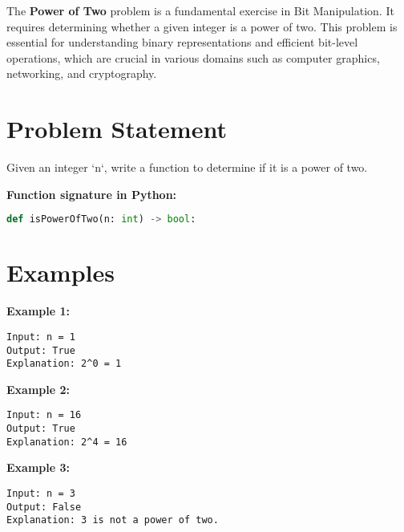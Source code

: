 
\label{chap:Power_of_Two}

The \textbf{Power of Two} problem is a fundamental exercise in Bit Manipulation. It requires determining whether a given integer is a power of two. This problem is essential for understanding binary representations and efficient bit-level operations, which are crucial in various domains such as computer graphics, networking, and cryptography.

\section*{Problem Statement}

Given an integer `n`, write a function to determine if it is a power of two.

\textbf{Function signature in Python:}
\begin{lstlisting}[language=Python]
def isPowerOfTwo(n: int) -> bool:
\end{lstlisting}

\section*{Examples}

\textbf{Example 1:}

\begin{verbatim}
Input: n = 1
Output: True
Explanation: 2^0 = 1
\end{verbatim}

\textbf{Example 2:}

\begin{verbatim}
Input: n = 16
Output: True
Explanation: 2^4 = 16
\end{verbatim}

\textbf{Example 3:}

\begin{verbatim}
Input: n = 3
Output: False
Explanation: 3 is not a power of two.
\end{verbatim}

